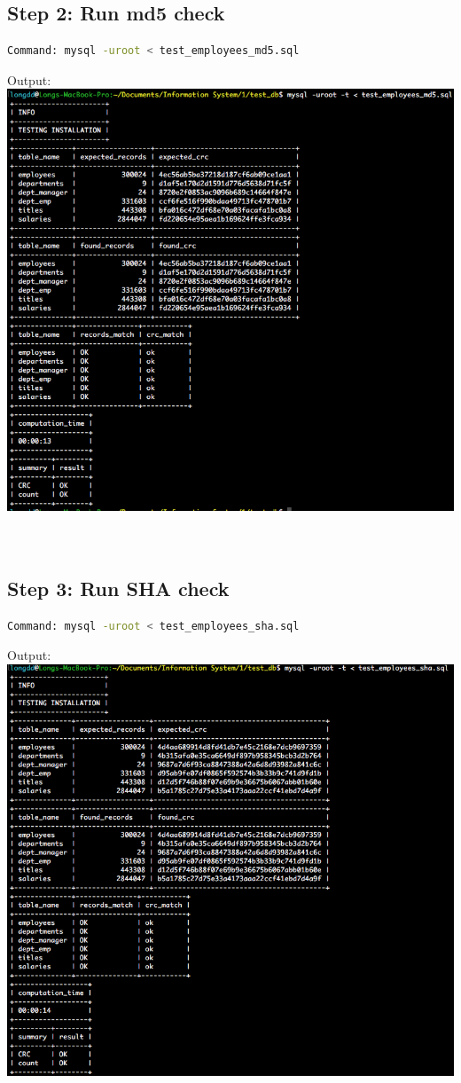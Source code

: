 \documentclass[12pt]{report}
\begin{document}
\subsection*{Step 2: Run md5 check}
\begin{lstlisting}[language=bash]
Command: mysql -uroot < test_employees_md5.sql
\end{lstlisting}
Output:
\\
\includegraphics[width=0.8\paperwidth]{test_md5}
\\
\\
\\
\subsection*{Step 3: Run SHA check}
\begin{lstlisting}[language=bash]
Command: mysql -uroot < test_employees_sha.sql
\end{lstlisting}
Output:
\\
\includegraphics[width=0.8\paperwidth]{test_sha}
\end{document}
